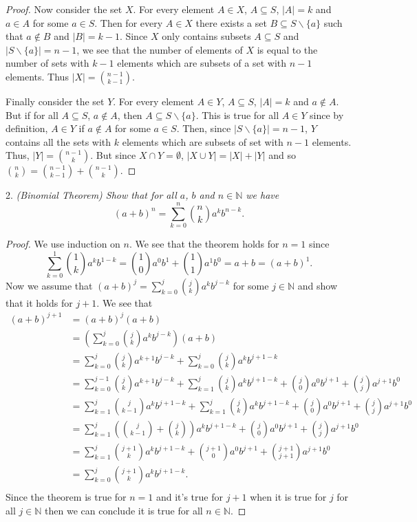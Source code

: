 \documentclass{article}
\begin{document}
\begin{flushleft}
\begin{proof}
Now consider the set $X$. For every element $A \in X$, $A \subseteq S$, $| A | = k$ and $a \in A$ for some $a \in S$. Then for every $A \in X$ there exists a set $B \subseteq S \backslash \{a\}$ such that $a \notin B$ and $| B | = k-1$. Since $X$ only contains subsets $A \subseteq S$ and $| S \backslash \{a\} | = n-1$, we see that the number of elements of $X$ is equal to the number of sets with $k-1$ elements which are subsets of a set with $n-1$ elements. Thus $| X | = \binom{n-1}{k-1}$.\newline

Finally consider the set $Y$. For every element $A \in Y$, $A \subseteq S$, $| A | = k$ and $a \notin A$. But if for all $A \subseteq S$, $a \notin A$, then $A \subseteq S \backslash \{a\}$. This is true for all $A \in Y$ since by definition, $A \in Y$ if $a \notin A$ for some $a \in S$. Then, since $| S \backslash \{a\} | = n-1$, $Y$ contains all the sets with $k$ elements which are subsets of set with $n-1$ elements. Thus, $| Y | = \binom{n-1}{k}$. But since $X \cap Y = \emptyset$, $| X \cup Y | = | X | + | Y |$ and so $\binom{n}{k} = \binom{n-1}{k-1} + \binom{n-1}{k}$.
\end{proof}

2. \textsl{(Binomial Theorem) Show that for all $a$, $b$ and $n \in \mathbb{N}$ we have
\[
(a+b)^n = \sum_{k=0}^n \binom {n} {k} a^k b^{n-k}.
\]}
\begin{proof}
We use induction on $n$. We see that the theorem holds for $n=1$ since
\[
\sum_{k=0}^1 \binom {1} {k} a^k b^{1-k} = \binom {1} {0} a^0 b^1 + \binom {1} {1} a^1 b^0 = a + b = (a + b)^1.
\]
Now we assume that $(a+b)^j = \sum_{k=0}^j \binom {j} {k} a^k b^{j-k}$ for some $j \in \mathbb{N}$ and show that it holds for $j+1$. We see that
\begin{align*}
(a+b)^{j+1} &= (a+b)^j(a+b)\\
			&= \left( \sum_{k=0}^j \binom{j}{k} a^k b^{j-k} \right) \left( a + b \right)\\
			&= \sum_{k=0}^j \binom{j}{k} a^{k+1} b^{j-k} + \sum_{k=0}^j \binom{j}{k} a^k b^{j+1-k}\\
			&= \sum_{k=0}^{j-1} \binom{j}{k} a^{k+1} b^{j-k} + \sum_{k=1}^j \binom{j}{k} a^k b^{j+1-k} + \binom{j}{0} a^0 b^{j+1} + \binom{j}{j} a^{j+1} b^0\\
			&= \sum_{k=1}^j \binom{j}{k-1} a^k b^{j+1-k} + \sum_{k=1}^j \binom{j}{k} a^k b^{j+1-k} + \binom{j}{0} a^0 b^{j+1} + \binom{j}{j} a^{j+1} b^0\\
			&= \sum_{k=1}^j \left( \binom{j}{k-1} + \binom{j}{k} \right) a^k b^{j+1-k} + \binom{j}{0} a^0 b^{j+1} + \binom{j}{j} a^{j+1} b^0\\
			&= \sum_{k=1}^j \binom{j+1}{k} a^k b^{j+1-k} + \binom{j+1}{0} a^0 b^{j+1} + \binom{j+1}{j+1} a^{j+1} b^0\\
			&=\sum_{k=0}^j \binom{j+1}{k} a^k b^{j+1-k}.\\
\end{align*}
Since the theorem is true for $n=1$ and it's true for $j+1$ when it is true for $j$ for all $j \in \mathbb{N}$ then we can conclude it is true for all $n \in \mathbb{N}$.
\end{proof}


\end{flushleft}
\end{document}
